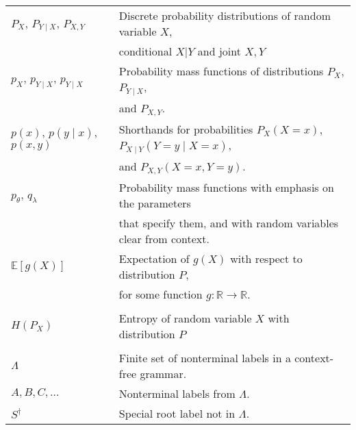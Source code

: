 \documentclass[11pt]{article}
\begin{document}
\begin{table}[h]
\begin{tabular}{l|l}
    $P_X$, $P_{Y \mid X}$, $P_{X, Y}$ & Discrete probability distributions of random variable $X$, \\ & conditional $X \vert Y$ and joint $X, Y$ \\

    $p_{X}$, $p_{Y \mid X}$, $p_{Y \mid X}$ & Probability mass functions of distributions $P_X$, $P_{Y \mid X}$, \\ & and $P_{X, Y}$. \\

    $p(x)$, $p(y \mid x)$, $p(x, y)$ & Shorthands for probabilities $P_{X}(X = x)$, $P_{X \mid Y}(Y = y \mid X = x)$, \\ & and $P_{X, Y}(X = x, Y = y)$. \\

    $p_{\theta}$, $q_{\lambda}$ & Probability mass functions with emphasis on the parameters \\ & that specify them, and with random variables clear from context.  \\

    $\mathbb{E}[g(X)]$ & Expectation of $g(X)$ with respect to distribution $P$, \\ & for some function $g: \mathbb{R} \to \mathbb{R}$. \\
    & \\

    $H(P_X)$ & Entropy of random variable $X$ with distribution $P$ \\
    & \\


    $\Lambda$ & Finite set of nonterminal labels in a context-free grammar.  \\
    $A, B, C, \dots$ & Nonterminal labels from $\Lambda$.  \\
    $S^{\dagger}$ & Special root label not in $\Lambda$.  \\



    \hline\hline
  \end{tabular}

\end{table}
\end{document}
